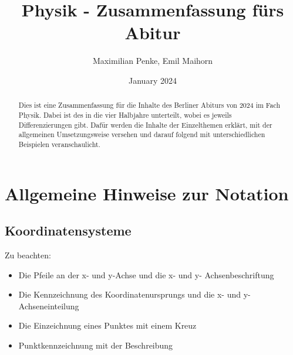 \documentclass{article}
\title{Physik - Zusammenfassung fürs Abitur}
\author{Maximilian Penke, Emil Maihorn}
\date{January 2024}
\begin{document}
    \maketitle

    \begin{abstract}
        Dies ist eine Zusammenfassung für die Inhalte des Berliner Abiturs von 2024 im Fach Physik. Dabei ist des in die vier Halbjahre unterteilt, wobei es jeweils Differenzierungen gibt. Dafür werden die Inhalte der Einzelthemen erklärt, mit der allgemeinen Umsetzungsweise versehen und darauf folgend mit unterschiedlichen Beispielen veranschaulicht.
    \end{abstract}

    \tableofcontents

    \section{Allgemeine Hinweise zur Notation}

        \subsection{Koordinatensysteme} 

        
        Zu beachten:
        \begin{itemize}
            \item Die Pfeile an der x- und y-Achse und die x- und y- Achsenbeschriftung
            \item Die Kennzeichnung des Koordinatenursprungs und die x- und y-Achseneinteilung
            \item Die Einzeichnung eines Punktes mit einem Kreuz
            \item Punktkennzeichnung mit der Beschreibung
        \end{itemize}

        \begin{figure}[h]
            \centering
        \end{figure}
\end{document}
